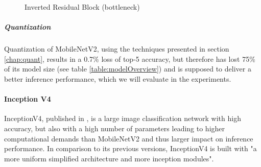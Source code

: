 \begin{figure}[!htb]
\centering
   \resizebox{.7\linewidth}{!}{}
\caption{Inverted Residual Block (bottleneck)}
\label{fig:bottleneckBlock}
\end{figure}

\subparagraph{Quantization}
Quantization of MobileNetV2, using the techniques presented in section \ref{chap:quant}, results in a  0.7\% loss of top-5 accuracy, but therefore has lost 75\% of its model size (see table \ref{table:modelOverview}) and is supposed to deliver a better inference performance, which we will evaluate in the experiments.



\paragraph{Inception V4}
InceptionV4, published in \cite{InceptionV4}, is a large image classification network with high accuracy, but also with a high number of parameters leading to higher computational demands than MobileNetV2 and thus larger impact on inference performance.
In comparison to its previous versions, InceptionV4 is built with "a more uniform simplified architecture and more inception modules". 

